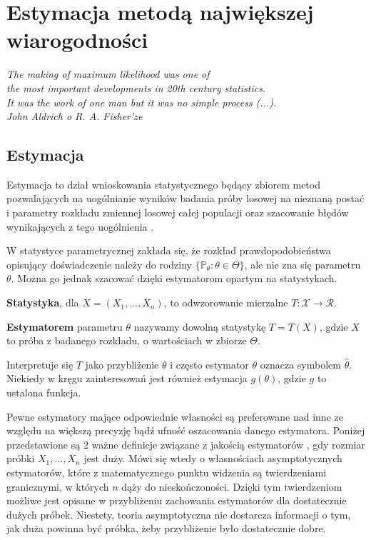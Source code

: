 \chapter{Estymacja metodą największej wiarogodności}
\begin{flushright}
\textit{The making of maximum likelihood was one of \\
the most important developments in 20th century statistics. \\
It was the work of one man but it was no simple process (...). \\
John Aldrich o R. A. Fisher'ze
}
\end{flushright}

\section{Estymacja}

Estymacja to dział wnioskowania statystycznego będący zbiorem metod pozwalających na uogólnianie wyników badania próby losowej na nieznaną postać i parametry rozkładu zmiennej losowej całej populacji oraz szacowanie błędów wynikających z tego uogólnienia \cite{wiki1}.

W statystyce parametrycznej zakłada się, że rozkład prawdopodobieństwa
opisujący doświadczenie należy do rodziny $\{\mathbb{P}_{\theta} : \theta \in \Theta\}$, ale nie zna się
parametru $\theta$. Można go jednak szacować dzięki estymatorom opartym na statystykach.

\begin{definition}
\textbf{Statystyka}, dla $X=(X_1,\dots,X_n)$, to odwzorowanie mierzalne $T: \mathcal{X} \rightarrow \mathcal{R}.$
\end{definition}

\begin{definition}
\textbf{Estymatorem} parametru $\theta$ nazywamy dowolną statystykę
$T = T(X)$, gdzie $X$ to próba z badanego rozkładu, o wartościach w zbiorze $\Theta$. 
\end{definition}

Interpretuje się $T$ jako przybliżenie $\theta$ i często estymator $\theta$ oznacza symbolem $\hat{\theta}$. Niekiedy w kręgu zainteresowań jest również estymacja $g(\theta)$, gdzie $g$ to ustalona funkcja.

Pewne estymatory mające odpowiednie własności są preferowane nad inne ze względu na większą precyzję bądź ufność oszacowania danego estymatora. Poniżej przedstawione są 2 ważne definicje związane z jakością estymatorów \cite{niemiro}, gdy rozmiar próbki $X_1, \dots , X_n$ jest duży. Mówi się wtedy o własnościach asymptotycznych estymatorów, które z matematycznego punktu widzenia są twierdzeniami
granicznymi, w których $n$ dąży do nieskończoności. Dzięki tym twierdzeniom możliwe jest opisane w przybliżeniu zachowania estymatorów dla dostatecznie dużych próbek. Niestety, teoria asymptotyczna nie dostarcza informacji o tym, jak duża powinna być próbka, żeby przybliżenie było dostatecznie dobre.

